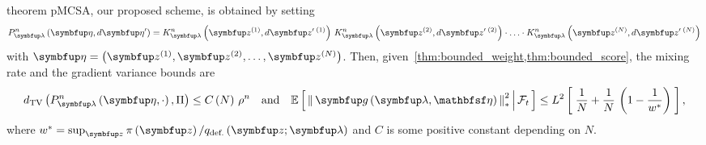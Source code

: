 
\begin{theoremEnd}{theorem}\label{thm:pmcsa}
  pMCSA, our proposed scheme, is obtained by setting
  {\small
  \begin{align*}
    P_{\vlambda}^n\left(\veta, d\veta^{\prime}\right)
    = 
    K_{\vlambda}^n\left(\vz^{(1)}, d\vz^{\prime\; (1)}\right)
    \,
    K_{\vlambda}^n\left(\vz^{(2)}, d\vz^{\prime\; (2)}\right)
    \cdot
    \ldots 
    \cdot
    K_{\vlambda}^n\left(\vz^{(N)}, d\vz^{\prime\; (N)}\right)
  \end{align*}
  }
  with \(\veta = \left(\vz^{(1)}, \vz^{(2)}, \ldots, \vz^{(N)}\right)\).
  Then, given~\cref{thm:bounded_weight,thm:bounded_score}, the mixing rate and the gradient variance bounds are
  {\small
  \begin{align*}
    \DTV{P_{\vlambda}^n\left(\veta, \cdot\right)}{\Pi}
    \leq
    C\left(N\right)\,{\rho^n}
    \quad\text{and}\quad
    \E{ \norm{ \vg\left(\vlambda, \rvveta\right) }^2_{*} \,\middle|\, \mathcal{F}_{t} }
    \leq
    L^2 \left[\; \frac{1}{N} + \frac{1}{N}\,\left(1 - \frac{1}{w^*}\right) \;\right],
  \end{align*}
  }
  where \(w^* = \sup_{\vz} \pi\left(\vz\right) / q_{\text{def.}}\left(\vz;\vlambda\right)\) and \(C\) is some positive constant depending on \(N\).
\end{theoremEnd}
